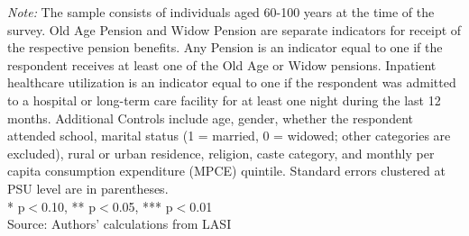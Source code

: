\begin{table}[H]
\centering
\vspace{1.8mm}
\caption{Inpatient Healthcare Utilization and Pension}
\label{tab:inpatient}
\vspace{3mm}
\vspace{2mm}
\begin{minipage}{0.95\textwidth}
\footnotesize \textit{Note:} The sample consists of individuals aged 60-100 years at the time of the survey. Old Age Pension and Widow Pension are separate indicators for receipt of the respective pension benefits. Any Pension is an indicator equal to one if the respondent receives at least one of the Old Age or Widow pensions. Inpatient healthcare utilization is an indicator equal to one if the respondent was admitted to a hospital or long-term care facility for at least one night during the last 12 months. Additional Controls include age, gender, whether the respondent attended school, marital status (1 = married, 0 = widowed; other categories are excluded), rural or urban residence, religion, caste category, and monthly per capita consumption expenditure (MPCE) quintile. Standard errors clustered at PSU level are in parentheses. \\ * p$<$0.10, ** p$<$0.05, *** p$<$0.01\\
Source: Authors' calculations from LASI
\end{minipage}
\end{table}
